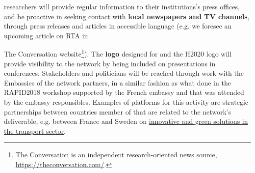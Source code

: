 \acronym researchers will provide regular information to their institutions's press offices, and be proactive in seeking contact with \textbf{local newspapers and TV channels}, through press releases and articles in accessible language (e.g. we foresee an upcoming article on RTA in {The Conversation website\footnote{The Conversation is an independent research-oriented news source, \url{https://theconversation.com/}.}). 
The \textbf{logo} designed for \acronym and the H2020 logo will provide visibility to the network by being included on presentations in conferences.
Stakeholders and politicians will be reached through work with the Embassies of the network partners, in a similar fashion as what done in the RAPID2018 workshop supported by the French embassy and that was attended by the embassy responsibles. Examples of platforms for this activity are strategic partnerships between countries member of \acronym that are related to the network's deliverable, e.g. between France and Sweden on \href{https://www.government.se/press-releases/2018/06/french-swedish-strategic-partnership-for-innovation-and-green-solutions-in-the-transport-sector/}{innovative and green solutions in the transport sector}.  


}
